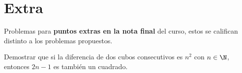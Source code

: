 \section{Extra}
Problemas para \textbf{puntos extras en la nota final} del curso, estos se califican distinto a los problemas propuestos.

\begin{problem}
    Demostrar que si la diferencia de dos cubos consecutivos es $n^{2}$ con $n \in \N$, entonces $2n - 1$ es también un cuadrado.
\end{problem}